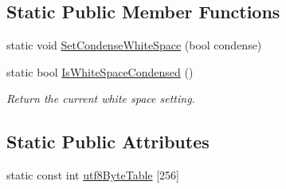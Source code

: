 \subsection*{Static Public Member Functions}
\begin{DoxyCompactItemize}
\item 
static void \hyperlink{class_ti_xml_base_a0f799ec645bfb8d8a969e83478f379c1}{SetCondenseWhiteSpace} (bool condense)
\item 
static bool \hyperlink{class_ti_xml_base_ad4b1472531c647a25b1840a87ae42438}{IsWhiteSpaceCondensed} ()
\begin{DoxyCompactList}\small\item\em Return the current white space setting. \item\end{DoxyCompactList}\end{DoxyCompactItemize}
\subsection*{Static Public Attributes}
\begin{DoxyCompactItemize}
\item 
static const int \hyperlink{class_ti_xml_base_ac8c86058137bdb4b413c3eca58f2d467}{utf8ByteTable} \mbox{[}256\mbox{]}
\end{DoxyCompactItemize}
